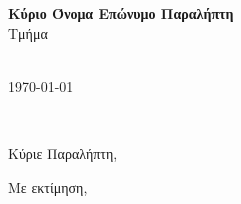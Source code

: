 \documentclass[11pt,a4paper]{letter} %
\def\opening#1{\thispagestyle{empty}
{\centering\fromaddress \vspace{0.5in} \\ %
\hspace*{\fill}\today\par} %
{\raggedright \toname \\ \toaddress \par} %
\vspace{0.4in} %
\noindent #1 %
}
\begin{document}

\begin{letter}
{\textbf{Κύριο Όνομα Επώνυμο Παραλήπτη}\\Τμήμα}


\opening{Κύριε Παραλήπτη,}

\lipsum[1-6]


\vspace{-0,5cm}
\closing{Με εκτίμηση,}


\end{letter}
\end{document}
